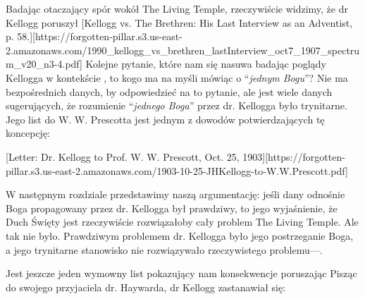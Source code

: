 Badając otaczający spór wokół The Living Temple, rzeczywiście widzimy, że dr Kellogg poruszył [Kellogg vs. The Brethren: His Last Interview as an Adventist, p. 58.][https://forgotten-pillar.s3.us-east-2.amazonaws.com/1990\_kellogg\_vs\_brethren\_lastInterview\_oct7\_1907\_spectrum\_v20\_n3-4.pdf] Kolejne pytanie, które nam się nasuwa badając poglądy Kellogga w kontekście , to kogo ma na myśli mówiąc o “\textit{jednym Bogu}”? Nie ma bezpośrednich danych, by odpowiedzieć na to pytanie, ale jest wiele danych sugerujących, że rozumienie “\textit{jednego Boga}” przez dr. Kellogga było trynitarne. Jego list do W. W. Prescotta jest jednym z dowodów potwierdzających tę koncepcję:

[Letter: Dr. Kellogg to Prof. W. W. Prescott, Oct. 25, 1903][https://forgotten-pillar.s3.us-east-2.amazonaws.com/1903-10-25-JHKellogg-to-W.W.Prescott.pdf]

W następnym rozdziale przedstawimy naszą argumentację: jeśli dany  odnośnie Boga propagowany przez dr. Kellogga był prawdziwy, to jego wyjaśnienie, że Duch Święty jest  rzeczywiście rozwiązałoby cały problem The Living Temple. Ale tak nie było. Prawdziwym problemem dr. Kellogga było jego postrzeganie Boga, a jego trynitarne stanowisko nie rozwiązywało rzeczywistego problemu—.

Jest jeszcze jeden wymowny list pokazujący nam konsekwencje poruszając  Pisząc do swojego przyjaciela dr. Haywarda, dr Kellogg zastanawiał się:


